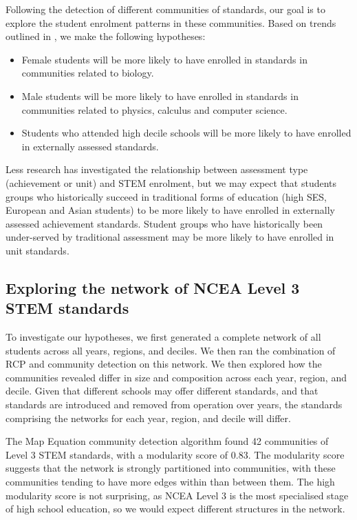 \documentclass[a4paper]{article}
\begin{document}
Following the detection of different communities of standards, our goal is to explore the student enrolment patterns in these communities. Based on trends outlined in \cite{EducationCounts_2018}, we make the following hypotheses:
\begin{itemize}
    \item Female students will be more likely to have enrolled in standards in communities related to biology.
    \item Male students will be more likely to have enrolled in standards in communities related to physics, calculus and computer science.
    \item Students who attended high decile schools will be more likely to have enrolled in externally assessed standards.
\end{itemize}
Less research has investigated the relationship between assessment type (achievement or unit) and STEM enrolment, but we may expect that students groups who historically succeed in traditional forms of education (high SES, European and Asian students) to be more likely to have enrolled in externally assessed achievement standards. Student groups who have historically been under-served by traditional assessment may be more likely to have enrolled in unit standards. 

\subsection{Exploring the network of NCEA Level 3 STEM standards}
To investigate our hypotheses, we first generated a complete network of all students across all years, regions, and deciles. We then ran the combination of RCP and community detection on this network. We then explored how the communities revealed differ in size and composition across each year, region, and decile. Given that different schools may offer different standards, and that standards are introduced and removed from operation over years, the standards comprising the networks for each year, region, and decile will differ. 

The Map Equation community detection algorithm found 42 communities of Level 3 STEM standards, with a modularity score of 0.83. The modularity score suggests that the network is strongly partitioned into communities, with these communities tending to have more edges within than between them. The high modularity score is not surprising, as NCEA Level 3 is the most specialised stage of high school education, so we would expect different structures in the network. 
\end{document}
